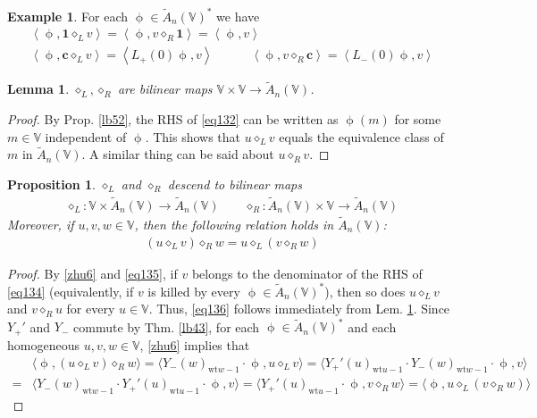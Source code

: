 \documentclass[11pt,b5paper,notitlepage]{article}
\theoremstyle{definition}
\newtheorem{eg}[df]{Example}
\theoremstyle{plain}
\newtheorem{pp}[df]{Proposition}
\newtheorem{lm}[df]{Lemma}
\newcommand{\wtd}{\widetilde}
\newcommand{\idt}{\mathbf{1}}
\newcommand{\Vbb}{\mathbb V}
\newcommand{\cbf}{\mathbf c}
\newcommand{\wt}{\mathrm{wt}}
\newcommand{\<}{\left\langle}
\renewcommand{\>}{\right\rangle}
\newcommand{\bigbk}[1]{\big\langle {#1}\big\rangle}
\numberwithin{equation}{section}
\begin{document}
\begin{eg}\label{lb62}
For each $\upphi\in\wtd A_n(\Vbb)^*$ we have
\begin{gather}
\<\upphi,\idt\diamond_L v\>=\<\upphi,v\diamond_R\idt\>=\<\upphi,v\>  \label{eq148}\\
\<\upphi,\cbf\diamond_L v\>=\<L_+(0)\upphi,v\>\qquad\quad
\<\upphi,v\diamond_R\cbf\>=\<L_-(0)\upphi,v\>  \label{eq149}
\end{gather}
\end{eg}



\begin{lm}\label{lb61}
$\diamond_L,\diamond_R$ are bilinear maps $\Vbb\times\Vbb\rightarrow\wtd A_n(\Vbb)$.
\end{lm}


\begin{proof}
By Prop. \ref{lb52}, the RHS of \eqref{eq132} can be written as $\upphi(m)$ for some $m\in\Vbb$ independent of $\upphi$. This shows that $u\diamond_L v$ equals the equivalence class of $m$ in $\wtd A_n(\Vbb)$. A similar thing can be said about $u\diamond_R v$.
\end{proof}




\begin{pp}\label{lb66}
$\diamond_L$ and $\diamond_R$ descend to bilinear maps
\begin{align}
\diamond_L:\Vbb\times \wtd A_n(\Vbb)\rightarrow \wtd A_n(\Vbb)\qquad \diamond_R:\wtd A_n(\Vbb)\times\Vbb\rightarrow\wtd A_n(\Vbb)   \label{eq136}
\end{align}
Moreover, if $u,v,w\in\Vbb$, then the following relation holds in $\wtd A_n(\Vbb)$:
\begin{align}
(u\diamond_L v)\diamond_R w=u\diamond_L(v\diamond_R w)  \label{eq137}
\end{align}
\end{pp}

\begin{proof}
By \eqref{zhu6} and \eqref{eq135}, if $v$ belongs to the denominator of the RHS of \eqref{eq134} (equivalently, if $v$ is killed by every $\upphi\in\wtd A_n(\Vbb)^*$), then so does $u\diamond_Lv$ and $v\diamond_R u$ for every $u\in \Vbb$. Thus, \eqref{eq136} follows immediately from Lem. \ref{lb61}. Since $Y_+'$ and $Y_-$ commute by Thm. \ref{lb43}, for each $\upphi\in\wtd A_n(\Vbb)^*$ and each homogeneous $u,v,w\in\Vbb$,  \eqref{zhu6} implies that
\begin{align*}
&\bigbk{\upphi,(u\diamond_L v)\diamond_R w}=\bigbk{Y_-(w)_{\wt w-1}\cdot \upphi,u\diamond_Lv}=\bigbk{Y_+'(u)_{\wt u-1}\cdot Y_-(w)_{\wt w-1}\cdot \upphi,v}\\
=&\bigbk{Y_-(w)_{\wt w-1}\cdot Y_+'(u)_{\wt u-1}\cdot \upphi,v}=\bigbk{Y_+'(u)_{\wt u-1}\cdot \upphi,v\diamond_R w}=\bigbk{\upphi,u\diamond_L(v\diamond_Rw)}
\end{align*}
\end{proof}
\end{document}
